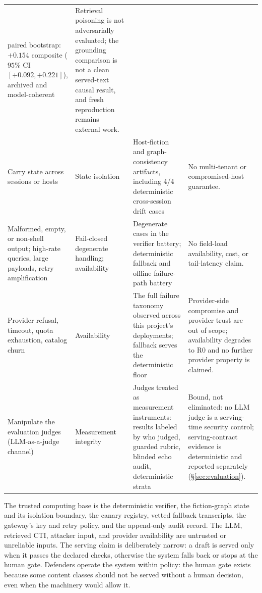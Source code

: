 \begin{table}[t]
\begin{tabular}{p{}p{}p{}p{}}
paired bootstrap: $+0.154$ composite ($95\%$ CI $[+0.092,+0.221]$),
archived and model-coherent &
Retrieval poisoning is not adversarially evaluated; the grounding
comparison is not a clean served-text causal result, and fresh
reproduction remains external work. \\
Carry state across sessions or hosts &
State isolation &
Host-fiction and graph-consistency artifacts, including 4/4
deterministic cross-session drift cases &
No multi-tenant or compromised-host guarantee. \\
Malformed, empty, or non-shell output; high-rate queries, large
payloads, retry amplification &
Fail-closed degenerate handling; availability &
Degenerate cases in the verifier battery; deterministic fallback and
offline failure-path battery &
No field-load availability, cost, or tail-latency claim. \\
Provider refusal, timeout, quota exhaustion, catalog churn &
Availability &
The full failure taxonomy observed across this project's deployments;
fallback serves the deterministic floor &
Provider-side compromise and provider trust are out of scope;
availability degrades to R0 and no further provider property is
claimed. \\
Manipulate the evaluation judges (LLM-as-a-judge channel) &
Measurement integrity &
Judges treated as measurement instruments: results labeled by who
judged, guarded rubric, blinded echo audit, deterministic strata &
Bound, not eliminated: no LLM judge is a serving-time security
control; serving-contract evidence is deterministic and reported
separately (\S\ref{sec:evaluation}). \\
\bottomrule
\end{tabular}
\end{table}

The trusted computing base is the deterministic verifier, the
fiction-graph state and its isolation boundary, the canary registry,
vetted fallback transcripts, the gateway's key and retry policy, and
the append-only audit record. The LLM, retrieved CTI, attacker input,
and provider availability are untrusted or unreliable inputs. The
serving claim is deliberately narrow: a draft is served only when it
passes the declared checks, otherwise the system falls back or stops at
the human gate. Defenders operate the system within policy: the human
gate exists because some content classes should not be served without
a human decision, even when the machinery would allow it.

